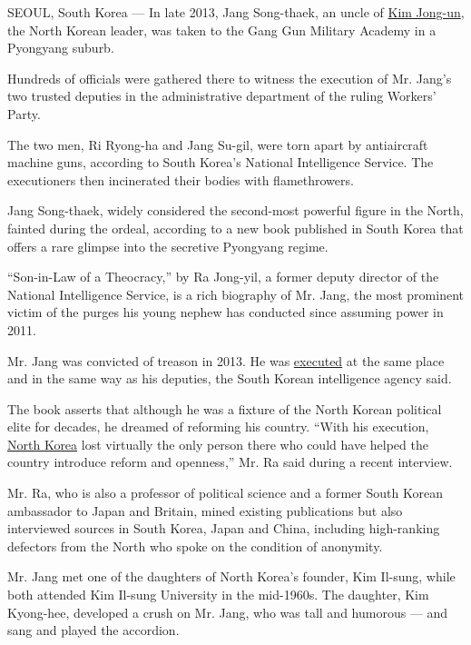 SEOUL, South Korea --- In late 2013, Jang Song-thaek, an uncle of
\href{http://topics.nytimes.com/top/reference/timestopics/people/k/kim_jongun/index.html?inline=nyt-per}{Kim
Jong-un}, the North Korean leader, was taken to the Gang Gun Military
Academy in a Pyongyang suburb.

Hundreds of officials were gathered there to witness the execution of
Mr. Jang's two trusted deputies in the administrative department of the
ruling Workers' Party.

The two men, Ri Ryong-ha and Jang Su-gil, were torn apart by
antiaircraft machine guns, according to South Korea's National
Intelligence Service. The executioners then incinerated their bodies
with flamethrowers.

Jang Song-thaek, widely considered the second-most powerful figure in
the North, fainted during the ordeal, according to a new book published
in South Korea that offers a rare glimpse into the secretive Pyongyang
regime.

``Son-in-Law of a Theocracy,'' by Ra Jong-yil, a former deputy director
of the National Intelligence Service, is a rich biography of Mr. Jang,
the most prominent victim of the purges his young nephew has conducted
since assuming power in 2011.

Mr. Jang was convicted of treason in 2013. He was
\href{http://www.nytimes.com/2013/12/13/world/asia/north-korea-says-uncle-of-executed.html?_r=0}{executed}
at the same place and in the same way as his deputies, the South Korean
intelligence agency said.

The book asserts that although he was a fixture of the North Korean
political elite for decades, he dreamed of reforming his country. ``With
his execution,
\href{http://topics.nytimes.com/top/news/international/countriesandterritories/northkorea/index.html?inline=nyt-geo}{North
Korea} lost virtually the only person there who could have helped the
country introduce reform and openness,'' Mr. Ra said during a recent
interview.

Mr. Ra, who is also a professor of political science and a former South
Korean ambassador to Japan and Britain, mined existing publications but
also interviewed sources in South Korea, Japan and China, including
high-ranking defectors from the North who spoke on the condition of
anonymity.

Mr. Jang met one of the daughters of North Korea's founder, Kim Il-sung,
while both attended Kim Il-sung University in the mid-1960s. The
daughter, Kim Kyong-hee, developed a crush on Mr. Jang, who was tall and
humorous --- and sang and played the accordion.

